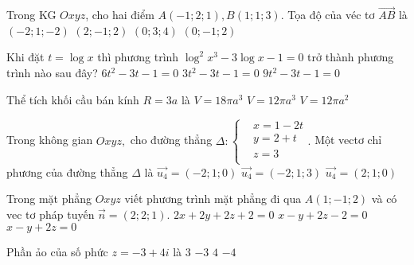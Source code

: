 \begin{ex}%
	Trong KG $Oxyz$, cho hai điểm $A(-1;2;1),B(1;1;3)$. Tọa độ của véc tơ $\overrightarrow{AB}$ là
	\choice
	{$(-2;1;-2)$}
	{\True $(2;-1;2)$}
	{ $(0;3;4)$}
	{ $(0;-1;2)$}
\end{ex}
\begin{ex}%
	Khi đặt $t=\log x$ thì phương trình ${{\log }^2}{x^3}-3\log x-1=0$ trở thành phương trình nào sau đây?
	{ $6t^2-3t-1=0$}
	{ $3t^2-3t-1=0$}
	{\True $9t^2-3t-1=0$}
\end{ex}
\begin{ex}%
	Thể tích khối cầu bán kính $R=3a$ là
	{ $V=18\pi {a^3}$}
	{ $V=12\pi {a^3}$}
	{ $V=12\pi {a^2}$}
\end{ex}
\begin{ex}%
	Trong không gian $Oxyz,$ cho đường thẳng $\Delta :\left\{ \begin{aligned}
		& x=1-2t \\
		& y=2+t \\
		& z=3 \\
	\end{aligned} \right..$ Một vectơ chỉ phương của đường thẳng $\Delta $ là
	{\True $\overrightarrow{u_4}=\left( -2;1;0 \right)$}
	{ $\overrightarrow{u_4}=\left( -2;1;3 \right)$}
	{ $\overrightarrow{u_4}=\left( 2;1;0 \right)$}
\end{ex}
\begin{ex}%
	Trong mặt phẳng $Oxyz$ viết phương trình mặt phẳng đi qua $A(1;-1;2)$ và có vec tơ pháp tuyến $\overrightarrow{n}=(2;2;1)$.
	{ $2x+2y+2z+2=0$}
	{ $x-y+2z-2=0$}
	{ $x-y+2z=0$}
\end{ex}
\begin{ex}%
	Phần ảo của số phức $z = -3 + 4i$ là
	\choice
	{ $3$}
	{ $-3$}
	{\True $4$}
	{ $-4$}
\end{ex}

